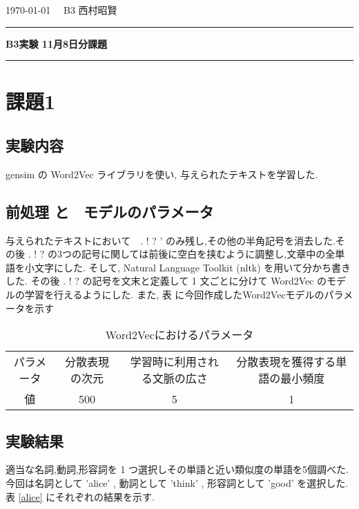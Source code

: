 \documentclass{jarticle}     %
\begin{document}
  \noindent
  \onecolumn
  \hspace{1em}
  \today
  \hfill
  \ \  B3 西村昭賢 

  \vspace{2mm}
  \hrule
  \begin{center}
  {\Large \bf B3実験 11月8日分課題}
  \end{center}
  \hrule
  \vspace{3mm}

\section{課題1}
\subsection{実験内容}
gensim の Word2Vec ライブラリを使い, 与えられたテキストを学習した.

\subsection{前処理 と　モデルのパラメータ}
与えられたテキストにおいて　.  !  ?  ' のみ残し,その他の半角記号を消去した.その後  . ! ? の3つの記号に関しては前後に空白を挟むように調整し,文章中の全単語を小文字にした.
そして, Natural Language Toolkit (nltk) を用いて分かち書きした. その後  . ! ? の記号を文末と定義して 1 文ごとに分けて Word2Vec のモデルの学習を行えるようにした.
また, 表 に今回作成したWord2Vecモデルのパラメータを示す

\begin{table}[h]
  \caption{Word2Vecにおけるパラメータ}
  \label{Word2Vec}
  \centering
  \begin{tabular}{c|ccc}
    \hline
    パラメータ     & 分散表現の次元  &  学習時に利用される文脈の広さ    & 分散表現を獲得する単語の最小頻度 \\
    値 &  500 & 5 & 1 \\
    \hline
  \end{tabular}
\end{table}



\subsection{実験結果}
適当な名詞,動詞,形容詞を 1 つ選択しその単語と近い類似度の単語を5個調べた.
今回は名詞として 'alice' , 動詞として 'think' , 形容詞として 'good' を選択した.表 \ref{alice} にそれぞれの結果を示す.
\end{document}

